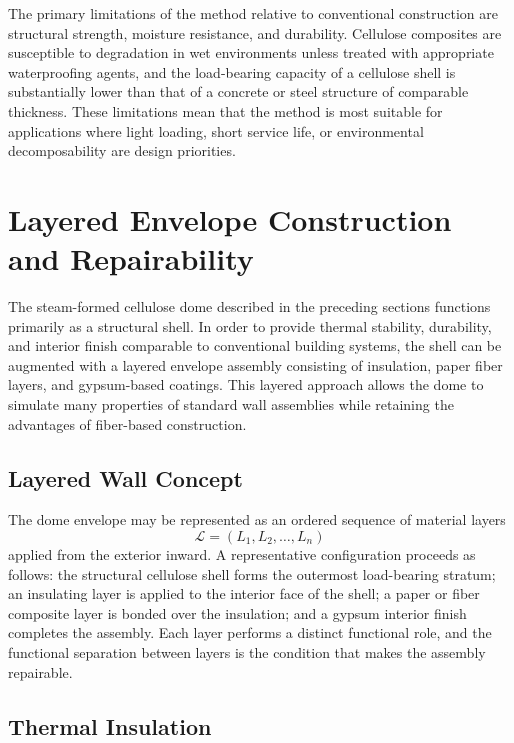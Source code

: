 \documentclass[12pt,a4paper]{article}
\begin{document}
The primary limitations of the method relative to conventional
construction are structural strength, moisture resistance, and
durability. Cellulose composites are susceptible to degradation in wet
environments unless treated with appropriate waterproofing agents, and
the load-bearing capacity of a cellulose shell is substantially lower
than that of a concrete or steel structure of comparable thickness.
These limitations mean that the method is most suitable for
applications where light loading, short service life, or environmental
decomposability are design priorities.

\section{Layered Envelope Construction and Repairability}

The steam-formed cellulose dome described in the preceding sections
functions primarily as a structural shell. In order to provide thermal
stability, durability, and interior finish comparable to conventional
building systems, the shell can be augmented with a layered envelope
assembly consisting of insulation, paper fiber layers, and gypsum-based
coatings. This layered approach allows the dome to simulate many
properties of standard wall assemblies while retaining the advantages
of fiber-based construction.

\subsection{Layered Wall Concept}

The dome envelope may be represented as an ordered sequence of material
layers
\begin{equation}
\mathcal{L} = (L_1, L_2, \dots, L_n)
\end{equation}
applied from the exterior inward. A representative configuration
proceeds as follows: the structural cellulose shell forms the outermost
load-bearing stratum; an insulating layer is applied to the interior
face of the shell; a paper or fiber composite layer is bonded over the
insulation; and a gypsum interior finish completes the assembly. Each
layer performs a distinct functional role, and the functional
separation between layers is the condition that makes the assembly
repairable.

\subsection{Thermal Insulation}
\end{document}
